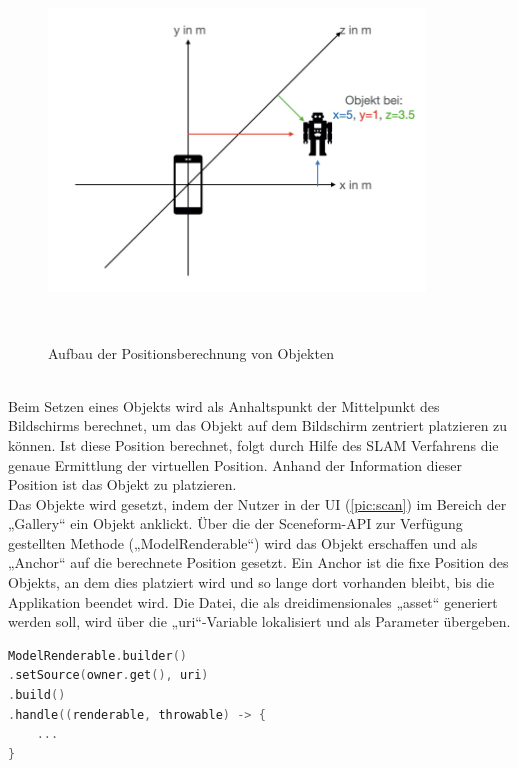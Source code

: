 \begin{figure}[hbt!]
    \centering
    \includegraphics[width=10cm,height=10cm,keepaspectratio]{4Umsetzung/Bilder/koordin.jpeg}
    \caption{Aufbau der Positionsberechnung von Objekten}
    \label{pic:koordin}
\end{figure}
\pagebreak
\\ 
Beim Setzen eines Objekts wird als Anhaltspunkt der Mittelpunkt des Bildschirms berechnet, um das Objekt auf dem Bildschirm zentriert platzieren zu können. Ist 
diese Position berechnet, folgt durch Hilfe des \acs{SLAM} Verfahrens die genaue Ermittlung der virtuellen Position. Anhand der Information dieser Position 
ist das Objekt zu platzieren. 
\\ 
Das Objekte wird gesetzt, indem der Nutzer in der \acs{UI} (\ref{pic:scan}) im Bereich der „Gallery“ ein Objekt anklickt.
Über die der Sceneform-\acs{API} zur Verfügung gestellten Methode („ModelRenderable“) wird das Objekt erschaffen und als „Anchor“ auf die berechnete Position 
gesetzt. Ein Anchor ist die fixe Position des Objekts, an dem dies platziert wird und so lange dort vorhanden bleibt, bis die Applikation beendet wird. Die Datei, 
die als dreidimensionales „asset“ generiert werden soll, wird über die „uri“-Variable lokalisiert und als Parameter übergeben. 
\\
\begin{lstlisting}[language=C,
    frame=lines,           % Ein Rahmen um den Code (single for box, lines for top and bottom)
    xleftmargin=\parindent,  % Rahmen link von den Zahlen
    style=algoBericht,
    label={code:modelrenderable},
    captionpos=b,           % Caption unter den Code setzen
caption={ModelRenderable Builder}]
ModelRenderable.builder()
.setSource(owner.get(), uri)
.build()
.handle((renderable, throwable) -> {
    ...
}
\end{lstlisting}                                    %
